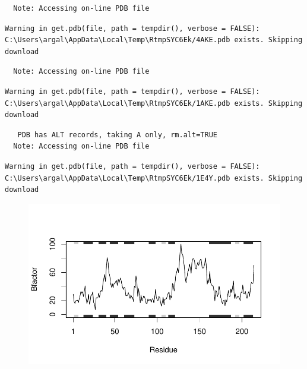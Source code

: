 \documentclass[
  letterpaper,
  DIV=11,
  numbers=noendperiod]{scrartcl}
\begin{document}
\begin{verbatim}
  Note: Accessing on-line PDB file
\end{verbatim}

\begin{verbatim}
Warning in get.pdb(file, path = tempdir(), verbose = FALSE):
C:\Users\argal\AppData\Local\Temp\RtmpSYC6Ek/4AKE.pdb exists. Skipping download
\end{verbatim}

\begin{verbatim}
  Note: Accessing on-line PDB file
\end{verbatim}

\begin{verbatim}
Warning in get.pdb(file, path = tempdir(), verbose = FALSE):
C:\Users\argal\AppData\Local\Temp\RtmpSYC6Ek/1AKE.pdb exists. Skipping download
\end{verbatim}

\begin{verbatim}
   PDB has ALT records, taking A only, rm.alt=TRUE
  Note: Accessing on-line PDB file
\end{verbatim}

\begin{verbatim}
Warning in get.pdb(file, path = tempdir(), verbose = FALSE):
C:\Users\argal\AppData\Local\Temp\RtmpSYC6Ek/1E4Y.pdb exists. Skipping download
\end{verbatim}

\begin{figure}[H]

{\centering \includegraphics{hw6_turnin_files/figure-pdf/unnamed-chunk-7-1.pdf}

}

\end{figure}
\end{document}
